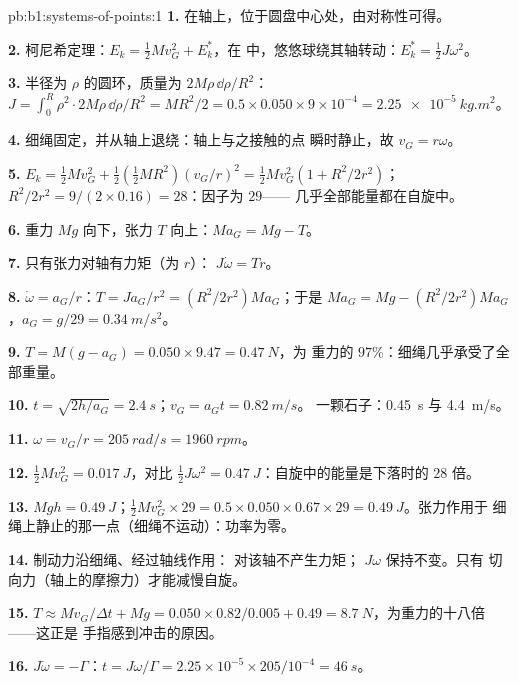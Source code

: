 \begin{solution}{pb:b1:systems-of-points:1}
\textbf{1.} 在轴上，位于圆盘中心处，由对称性可得。

\textbf{2.} 柯尼希定理：$E_k = \tfrac12 Mv_G^2 + E_k^*$，在
中，悠悠球绕其轴转动：$E_k^* = \tfrac12 J\omega^2$。

\textbf{3.} 半径为 $\rho$ 的圆环，质量为 $2M\rho\,\dd\rho/R^2$：$J = \int_0^R
\rho^2\cdot 2M\rho\,\dd\rho/R^2 = MR^2/2 = 0.5 \times 0.050 \times 9\times10^{-4}
= \qty{2.25e-5}{kg.m^2}$。

\textbf{4.} 细绳固定，并从轴上退绕：轴上与之接触的点
瞬时静止，故 $v_G = r\omega$。

\textbf{5.} $E_k = \tfrac12 Mv_G^2 + \tfrac12(\tfrac12 MR^2)(v_G/r)^2 = \tfrac12
Mv_G^2(1 + R^2/2r^2)$；$R^2/2r^2 = 9/(2 \times 0.16) = 28$：因子为 $29$——
几乎全部能量都在自旋中。

\textbf{6.} 重力 $Mg$ 向下，张力 $T$ 向上：$Ma_G = Mg - T$。

\textbf{7.} 只有张力对轴有力矩（为 $r$）：
$J\dot\omega = Tr$。

\textbf{8.} $\dot\omega = a_G/r$：$T = Ja_G/r^2 = (R^2/2r^2)Ma_G$；于是
$Ma_G = Mg - (R^2/2r^2)Ma_G$，$a_G = g/29 = \qty{0.34}{m/s^2}$。

\textbf{9.} $T = M(g - a_G) = 0.050 \times 9.47 = \qty{0.47}{N}$，为
重力的 $97\%$：细绳几乎承受了全部重量。

\textbf{10.} $t = \sqrt{2h/a_G} = \qty{2.4}{s}$；$v_G = a_Gt = \qty{0.82}{m/s}$。
一颗石子：\qty{0.45}{s} 与 \qty{4.4}{m/s}。

\textbf{11.} $\omega = v_G/r = \qty{205}{rad/s} = \qty{1960}{rpm}$。

\textbf{12.} $\tfrac12 Mv_G^2 = \qty{0.017}{J}$，对比 $\tfrac12 J\omega^2 =
\qty{0.47}{J}$：自旋中的能量是下落时的 $28$ 倍。

\textbf{13.} $Mgh = \qty{0.49}{J}$；$\tfrac12 Mv_G^2 \times 29 = 0.5 \times 0.050
\times 0.67 \times 29 = \qty{0.49}{J}$。张力作用于
细绳上静止的那一点（细绳不运动）：功率为零。

\textbf{14.} 制动力沿细绳、经过轴线作用：
对该轴不产生力矩； $J\omega$ 保持不变。只有
切向力（轴上的摩擦力）才能减慢自旋。

\textbf{15.} $T \approx Mv_G/\Delta t + Mg = 0.050 \times 0.82/0.005 + 0.49 =
\qty{8.7}{N}$，为重力的十八倍——这正是
手指感到冲击的原因。

\textbf{16.} $J\dot\omega = -\Gamma$：$t = J\omega/\Gamma = 2.25\times10^{-5} \times
205/10^{-4} = \qty{46}{s}$。


\end{solution}
